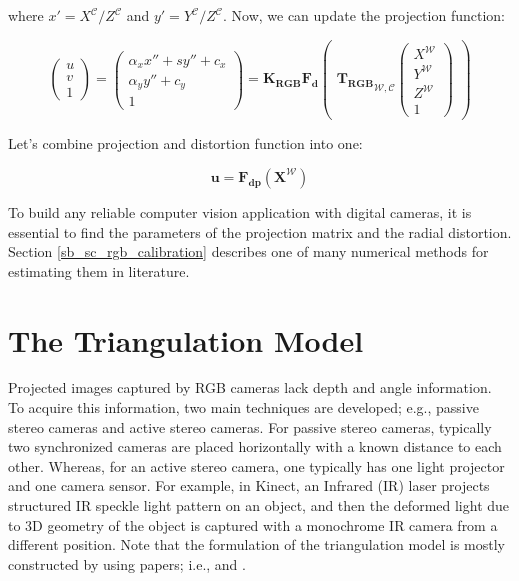 \documentclass[a4paper]{report}
\numberwithin{figure}{section}
\begin{document}
where $x' = X^{\mathcal{C}}/Z^{\mathcal{C}}$ and $y' = 
Y^{\mathcal{C}}/Z^{\mathcal{C}}$. Now, we 
can update 
the 
projection function:

\begin{equation}
  \begin{pmatrix}
    u\\
    v\\
    1
  \end{pmatrix}
  =
  \begin{pmatrix}
    \alpha_x x'' + sy''+ c_x\\
    \alpha_y y'' + c_y\\
    1
  \end{pmatrix}
    =
    \mathbf{K_{RGB}}
    \mathbf{F_{d}}\begin{pmatrix}
       {\mathbf{T_{RGB}}}_{\mathcal{W}, \mathcal{C}}
      \begin{pmatrix}
        X^{\mathcal{W}}\\
        Y^{\mathcal{W}}\\
        Z^{\mathcal{W}}\\
        1
      \end{pmatrix}
    \end{pmatrix}\label{eq:proj_func_w_f_c}
\end{equation} 

Let's combine projection and distortion function into one:

\begin{equation}\label{eq:simplyfied_dist_proj_func}
  \mathbf{u} = \mathbf{F_{dp}}(\mathbf{X^{\mathcal{W}}})
\end{equation} 


To build any reliable computer vision application with digital cameras, it is 
essential to find the parameters of the projection matrix and the radial 
distortion.  Section \ref{sb_sc_rgb_calibration} describes one of many 
numerical methods for 
estimating them in literature.

\section{The Triangulation Model} \label{sc_depth_model}

Projected images captured by RGB cameras lack depth and angle information. To 
acquire this information, two main techniques are developed; e.g., passive 
stereo cameras and active stereo cameras. For passive stereo cameras, 
typically two synchronized cameras are placed horizontally with a known 
distance to each other. 
Whereas, for an active stereo camera, one typically has one light projector 
and one camera sensor. For example, in Kinect, an Infrared (IR) laser projects 
structured IR speckle light pattern on an object, and then the deformed light 
due to 3D geometry of the object is captured with a monochrome IR camera from 
a different position. Note that the formulation of the triangulation model is 
mostly constructed by using papers; i.e., \parencite{Park2012a} and 
\parencite{Khoshelham2012a}.
\end{document}
